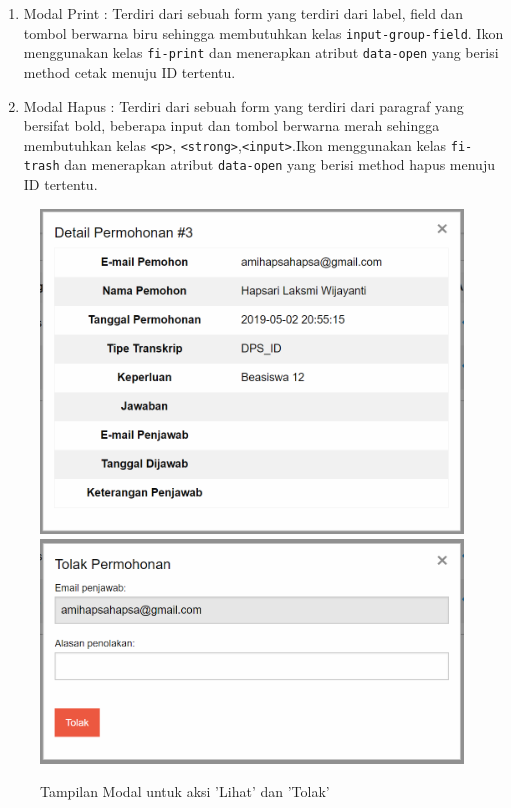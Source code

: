 \documentclass[a4paper,twoside]{article}
\begin{document}
\begin{enumerate}
\begin{enumerate}
			\item Modal Print : Terdiri dari sebuah form yang terdiri dari label, field dan tombol berwarna biru sehingga membutuhkan kelas \colorbox{mygray}{\verb|input-group-field|}. Ikon menggunakan kelas \colorbox{mygray}{\texttt{fi-print}} dan menerapkan atribut \colorbox{mygray}{\texttt{data-open}} yang berisi method cetak menuju ID tertentu.
			
			\item Modal Hapus : Terdiri dari sebuah form yang terdiri dari paragraf yang bersifat bold, beberapa input dan tombol berwarna merah sehingga membutuhkan kelas \colorbox{mygray}{\verb|<p>|}, \colorbox{mygray}{\texttt{<strong>}},\colorbox{mygray}{\texttt{<input>}}.Ikon menggunakan kelas \texttt{fi-trash} dan menerapkan atribut \texttt{data-open} yang berisi method hapus menuju ID tertentu.
		\end{enumerate}
		
		\begin{figure} [H]
			\centering  
			\includegraphics[scale=0.5]{Modal-Lihat-Manajemen-Cetak-Transkrip.png}  
			\includegraphics[scale=0.5]{Modal-Tolak-Manajemen-Cetak-Transkrip.png} 
			\caption{Tampilan Modal untuk aksi 'Lihat' dan 'Tolak'} 	
		\end{figure}
		

\end{enumerate}
\end{document}
